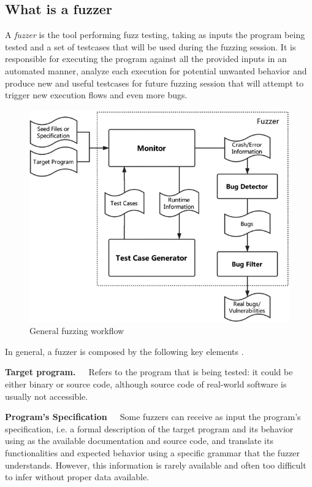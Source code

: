 \subsection{What is a fuzzer}  \label{fuzzers}
A \textit{fuzzer} is the tool performing fuzz testing, taking as inputs the program being tested and a set of testcases that will be used during the fuzzing session. It is responsible for executing the program against all the provided inputs in an automated manner, analyze each execution for potential unwanted behavior and produce new and useful testcases for future fuzzing session that will attempt to trigger new execution flows and even more bugs.
\begin{figure}[h]
\centering
\includegraphics[scale=0.46]{foto/fuzzing_workflow.png}
\caption{General fuzzing workflow \cite{fuzzing_survey}}
\label{fig:fuzzing_workflow}
\end{figure}

In general, a fuzzer is composed by the following key elements \cite{afl_docs} \cite{fuzzing_survey}.

\textbf{Target program.}\ \ \ Refers to the program that is being tested: it could be either binary or source code, although source code of real-world software is usually not accessible.

\textbf{Program's Specification}\ \ \ Some fuzzers can receive as input the program's specification, i.e. a formal description of the target program and its behavior using as the available documentation and source code, and translate its functionalities and expected behavior using a specific grammar that the fuzzer understands. However, this information is rarely available and often too difficult to infer without proper data available.


